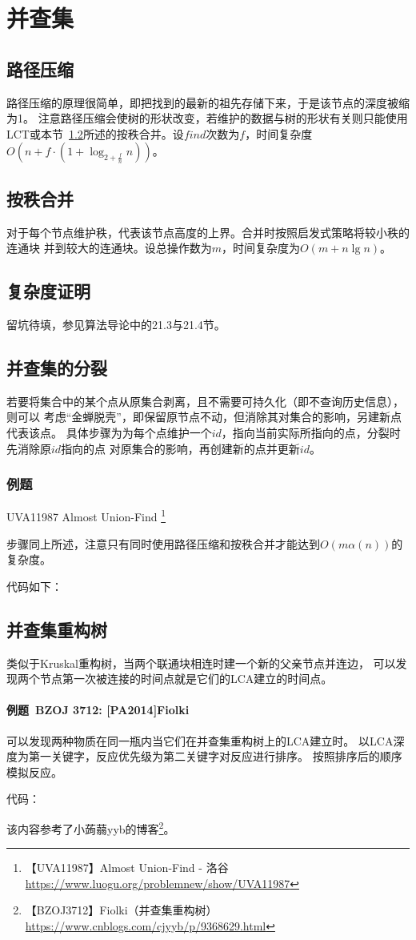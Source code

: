 \section{并查集}\label{DSU}
\subsection{路径压缩}
路径压缩的原理很简单，即把找到的最新的祖先存储下来，于是该节点的深度被缩为1。
注意路径压缩会使树的形状改变，若维护的数据与树的形状有关则只能使用
LCT或本节~\ref{RankMerge}所述的按秩合并。设$find$次数为$f$，时间复杂度
$O(n+f\cdot (1+\log_{2+\frac{f}{n}}n))$。
\subsection{按秩合并}\label{RankMerge}
对于每个节点维护秩，代表该节点高度的上界。合并时按照启发式策略将较小秩的连通块
并到较大的连通块。设总操作数为$m$，时间复杂度为$O(m+n\lg n)$。
\subsection{复杂度证明}
留坑待填，参见算法导论\cite{ITA3}中的21.3与21.4节。
\subsection{并查集的分裂}
若要将集合中的某个点从原集合剥离，且不需要可持久化（即不查询历史信息），则可以
考虑``金蝉脱壳''，即保留原节点不动，但消除其对集合的影响，另建新点代表该点。
具体步骤为为每个点维护一个$id$，指向当前实际所指向的点，分裂时先消除原$id$指向的点
对原集合的影响，再创建新的点并更新$id$。

\subsubsection{例题}

UVA11987 Almost Union-Find \footnote{
    【UVA11987】Almost Union-Find - 洛谷
    \url{https://www.luogu.org/problemnew/show/UVA11987}}

步骤同上所述，注意只有同时使用路径压缩和按秩合并才能达到$O(m\alpha(n))$的复杂度。

代码如下：


\subsection{并查集重构树}
类似于Kruskal重构树，当两个联通块相连时建一个新的父亲节点并连边，
可以发现两个节点第一次被连接的时间点就是它们的LCA建立的时间点。

\paragraph{例题~BZOJ 3712: [PA2014]Fiolki}

可以发现两种物质在同一瓶内当它们在并查集重构树上的LCA建立时。
以LCA深度为第一关键字，反应优先级为第二关键字对反应进行排序。
按照排序后的顺序模拟反应。

代码：


该内容参考了小蒟蒻yyb的博客\footnote{
    【BZOJ3712】Fiolki（并查集重构树）
    \url{https://www.cnblogs.com/cjyyb/p/9368629.html}
}。
